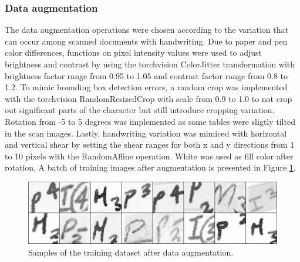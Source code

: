 \documentclass{article}
\begin{document}
\subsubsection{Data augmentation}

The data augmentation operations were chosen according to the variation that can 
occur among scanned documents with handwriting.
Due to paper and pen color differences, functions on pixel intensity
values were used to adjust brightness and contrast by using the 
torchvision ColorJitter transformation with brightness factor range from 
0.95 to 1.05 and contrast factor range from 0.8 to 1.2. To mimic bounding box detection errors, 
a random crop was implemented with the torchvision RandomResizedCrop with 
scale from 0.9 to 1.0 to not crop out significant parts of the character but 
still introduce cropping variation. Rotation from -5 to 5 degrees 
was implemented as some tables were sligtly tilted in the scan images. 
Lastly, handwriting variation was mimiced with horizontal and vertical 
shear by setting the shear ranges for both x and y directions from 1 
to 10 pixels with the RandomAffine operation. White was used as fill color after rotation.
 A batch of training images after augmentation
is presented in Figure \ref{image:augmented}.

\begin{figure}[h]
    \centering
    \includegraphics*[scale=.2]{../images/augmented.png}
    \caption{Samples of the training dataset after data augmentation.}
    \label{image:augmented}
\end{figure}
\end{document}
